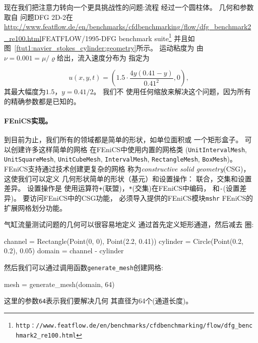 现在我们把注意力转向一个更具挑战性的问题:流程
经过一个圆柱体。 几何和参数取自
问题DFG 2D-2在\url{http://www.featflow.de/en/benchmarks/cfdbenchmarking/flow/dfg_benchmark2_re100.html}{FEATFLOW/1995-DFG benchmark suite}\footnote{\texttt{http：//www.featflow.de/en/benchmarks/cfdbenchmarking/flow/dfg\_benchmark2\_re100.html}}
并且如图~\ref{ftut1:navier_stokes_cylinder:geometry}所示。 运动粘度为
由$\nu = 0.001 = \mu/\varrho$给出，流入速度分布为
指定为

\[
  u(x, y, t) = \left(1.5 \cdot \frac{4y(0.41 - y)}{0.41^2}, 0\right),
\]
其最大幅度为$1.5$，$y = 0.41/2$。 我们不
使用任何缩放来解决这个问题，因为所有的精确参数都是已知的。


\paragraph{FEniCS实现。}
到目前为止，我们所有的领域都是简单的形状，如单位面积或
一个矩形盒子。 可以创建许多这样简单的网格
在FEniCS中使用内置的网格类
(\texttt{UnitIntervalMesh},
\texttt{UnitSquareMesh},
\texttt{UnitCubeMesh},
\texttt{IntervalMesh},
\texttt{RectangleMesh},
\texttt{BoxMesh})。
FEniCS支持通过技术创建更复杂的网格
称为\emph{constructive solid geometry}(CSG)，这使我们可以定义
几何形状简单的形状（基元）和设置操作：
联合，交集和设置差异。 设置操作是
使用运算符\texttt{+}(联盟)，\texttt{*}(交集)在FEniCS中编码，
和\texttt{-}(设置差异)。 要访问FEniCS中的CSG功能，
必须导入提供的FEniCS模块\texttt{mshr}
FEniCS的扩展网格划分功能。


气缸流量测试问题的几何可以很容易地定义
通过首先定义矩形通道，然后减去
圈:

\begin{python}
channel = Rectangle(Point(0, 0), Point(2.2, 0.41))
cylinder = Circle(Point(0.2, 0.2), 0.05)
domain = channel - cylinder
\end{python}
然后我们可以通过调用函数\verb!generate_mesh!创建网格:

\begin{python}
mesh = generate_mesh(domain, 64)
\end{python}
这里的参数\texttt{64}表示我们要解决几何
其直径为64个(通道长度)。

